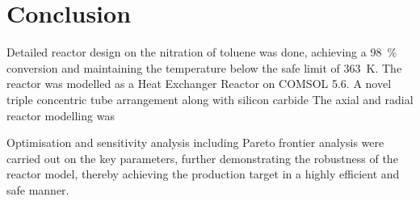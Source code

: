 \section{Conclusion} \label{sec:conclusion}
Detailed reactor design on the nitration of toluene was done, achieving a \SI{98}{\%} conversion and maintaining the temperature below the safe limit of \SI{363}{\K}. The reactor was modelled as a Heat Exchanger Reactor on COMSOL 5.6. A novel triple concentric tube arrangement along with silicon carbide 
The axial and radial reactor modelling was 

Optimisation and sensitivity analysis including Pareto frontier analysis were carried out on the key parameters, further demonstrating the robustness of the reactor model, thereby achieving the production target in a highly efficient and safe manner.  

